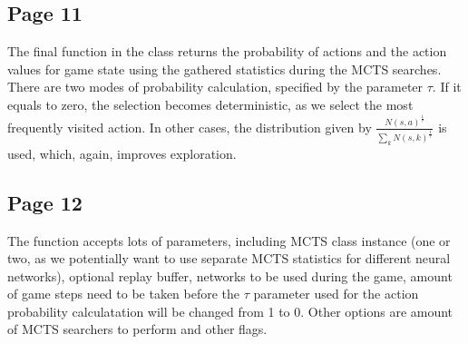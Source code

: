 \subsection{Page 11}
The final function in the class returns the probability of actions and the
action values for game state using the gathered statistics during the MCTS
searches. There are two modes of probability calculation, specified by the
parameter \begin{math}\tau\end{math}. If it equals to zero, the selection becomes deterministic, as we
select the most frequently visited action. In other cases, the distribution
given by
\begin{math}\frac{N(s,a)^\frac{1}{\tau}}{\sum_kN(s,k)^\frac{1}{\tau}}\end{math}
is used, which, again, improves exploration.

\subsection{Page 12}
The function accepts lots of parameters, including MCTS class instance (one or
two, as we potentially want to use separate MCTS statistics for different neural
networks), optional replay buffer, networks to be used during the game, amount
of game steps need to be taken before the \begin{math}\tau\end{math} parameter used for the action
probability calculatation will be changed from 1 to 0. Other options are amount
of MCTS searchers to perform and other flags.

  

